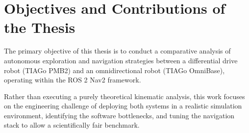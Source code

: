 \section{Objectives and Contributions of the Thesis}

The primary objective of this thesis is to conduct a comparative analysis of autonomous exploration and navigation strategies between a differential drive robot (TIAGo PMB2) and an omnidirectional robot (TIAGo OmniBase), operating within the ROS 2 Nav2 framework. 

Rather than executing a purely theoretical kinematic analysis, this work focuses on the engineering challenge of deploying both systems in a realistic simulation environment, identifying the software bottlenecks, and tuning the navigation stack to allow a scientifically fair benchmark.

